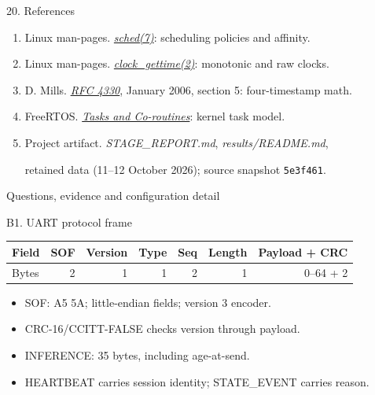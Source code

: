 \begin{frame}[t]{20. References}
\begin{enumerate}
\item Linux man-pages. \href{https://man7.org/linux/man-pages/man7/sched.7.html}{\textit{sched(7)}}: scheduling policies and affinity.
\item Linux man-pages. \href{https://man7.org/linux/man-pages/man2/clock_gettime.2.html}{\textit{clock\_gettime(2)}}: monotonic and raw clocks.
\item D. Mills. \href{https://www.rfc-editor.org/rfc/rfc4330}{\textit{RFC 4330}}, January 2006, section 5: four-timestamp math.
\item FreeRTOS. \href{https://www.freertos.org/Documentation/02-Kernel/02-Kernel-features/01-Tasks-and-co-routines/00-Tasks-and-co-routines}{\textit{Tasks and Co-routines}}: kernel task model.
\item Project artifact. \textit{STAGE\_REPORT.md}, \textit{results/README.md},\par
retained data (11--12 October 2026); source snapshot \texttt{5e3f461}.
\end{enumerate}
\end{frame}

\appendix
\begin{frame}[c]\medskip Questions, evidence and configuration detail\end{frame}

\begin{frame}[t]{B1. UART protocol frame}
\centering\begin{tabular}{@{}lrrrrrr@{}}\toprule
Field & SOF & Version & Type & Seq & Length & Payload + CRC\\\midrule
Bytes & 2 & 1 & 1 & 2 & 1 & 0--64 + 2\\\bottomrule
\end{tabular}\par\par\bigskip\raggedright
\begin{itemize}\item SOF: A5 5A; little-endian fields; version 3 encoder.\item CRC-16/CCITT-FALSE checks version through payload.\item INFERENCE: 35 bytes, including age-at-send.\item HEARTBEAT carries session identity; STATE\_EVENT carries reason.\end{itemize}
\end{frame}

